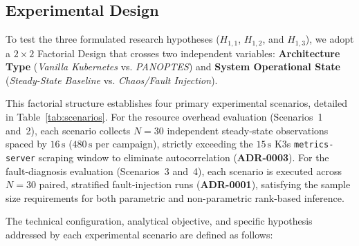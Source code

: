 \subsection{Experimental Design}
\label{sec:experimental-design}

To test the three formulated research hypotheses ($H_{1,1}$, $H_{1,2}$, and $H_{1,3}$), we adopt a $2\times2$ Factorial Design that crosses two independent variables: \textbf{Architecture Type} (\textit{Vanilla Kubernetes} vs. \textit{PANOPTES}) and \textbf{System Operational State} (\textit{Steady-State Baseline} vs. \textit{Chaos/Fault Injection}). 

This factorial structure establishes four primary experimental scenarios, detailed in Table~\ref{tab:scenarios}. For the resource overhead evaluation (Scenarios~1 and~2), each scenario collects $N = 30$ independent steady-state observations spaced by $16\,\text{s}$ ($480\,\text{s}$ per campaign), strictly exceeding the $15\,\text{s}$ K3s \texttt{metrics-server} scraping window to eliminate autocorrelation (\textbf{ADR-0003}). For the fault-diagnosis evaluation (Scenarios~3 and~4), each scenario is executed across $N = 30$ paired, stratified fault-injection runs (\textbf{ADR-0001}), satisfying the sample size requirements for both parametric and non-parametric rank-based inference.



The technical configuration, analytical objective, and specific hypothesis addressed by each experimental scenario are defined as follows:

